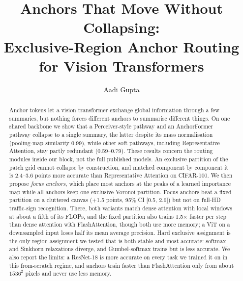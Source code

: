 \documentclass[runningheads]{llncs}
\begin{document}
\title{Anchors That Move Without Collapsing:\\Exclusive-Region Anchor Routing for Vision Transformers}
\author{Aadi Gupta}

\maketitle

\begin{abstract}
Anchor tokens let a vision transformer exchange global information through a few summaries, but
nothing forces different anchors to summarise different things. On one shared backbone we show
that a Perceiver-style pathway and an AnchorFormer pathway collapse to a single summary, the
latter despite its mass normalisation (pooling-map similarity 0.99), while other soft pathways,
including Representative Attention, stay partly redundant (0.59--0.79). These results concern the
routing modules inside our block, not the full published models. An
exclusive partition of the patch grid cannot collapse by construction, and matched component by
component it is 2.4--3.6 points more accurate than Representative Attention on CIFAR-100. We
then propose \emph{focus anchors}, which place most anchors at the peaks of a learned importance
map while all anchors keep one exclusive Voronoi partition. Focus anchors beat a fixed partition
on a cluttered canvas (+1.5 points, 95\% CI [0.5, 2.6]) but not on full-HD traffic-sign
recognition. There, both variants match dense attention with local windows at about a fifth of
its FLOPs, and the fixed partition also trains 1.5$\times$ faster per step than dense attention
with FlashAttention, though both use more memory; a ViT on a downsampled input loses half its
mean average precision. Hard
exclusive assignment is the only region assignment we tested that is both stable and most
accurate: softmax and Sinkhorn relaxations diverge, and Gumbel-softmax trains but is less
accurate. We also report the limits: a ResNet-18 is more accurate on every task we trained it on
in this from-scratch regime, and
anchors train faster than FlashAttention only from about $1536^2$ pixels and never use less
memory.
\end{abstract}
\end{document}
